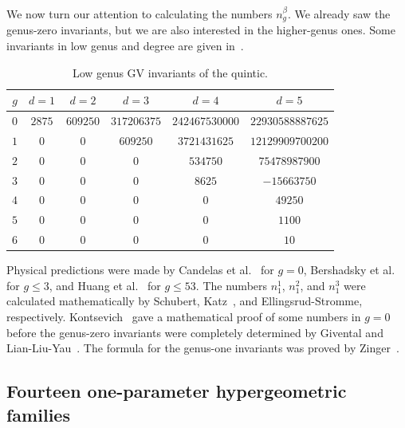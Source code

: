 \documentclass[10pt]{amsart}
\theoremstyle{definition}
\theoremstyle{remark}
\theoremstyle{plain}
\theoremstyle{definition}
\theoremstyle{remark}
\newcommand{\1}{\mathbf{1}}
\newcommand{\2}{\mathbf{2}}
\newcommand{\3}{\mathbf{3}}
\begin{document}
We now turn our attention to calculating the numbers $n_g^{\beta}$. We already saw the genus-zero invariants, but we are also interested in the higher-genus ones. Some invariants in low genus and degree are given in~.
\begin{table}[htpb]
    \centering
    \caption{Low genus GV invariants of the quintic.}
    \label{tab:g0gvquintic}
    \begin{tabular}{cccccc}
        \toprule
        $g$ & $d=1$ & $d=2$ & $d=3$ & $d=4$ & $d=5$ \\
        \midrule
        $0$ & $2875$ & $609250$ & $317206375$ & $242467530000$ & $22930588887625$ \\
        $1$ & $0$ & $0$ & $609250$ & $3721431625$ & $12129909700200$ \\
        $2$ & $0$ & $0$ & $0$ & $534750$ & $75478987900$ \\
        $3$ & $0$ & $0$ & $0$ & $8625$ & $-15663750$ \\
        $4$ & $0$ & $0$ & $0$ & $0$ & $49250$ \\
        $5$ & $0$ & $0$ & $0$ & $0$ & $1100$ \\
        $6$ & $0$ & $0$ & $0$ & $0$ & $10$ \\
        \bottomrule
    \end{tabular}
\end{table}

Physical predictions were made by Candelas et al.~\cite{cdgp} for $g=0$, Bershadsky et al.~\cite{bcov} for $g \leq 3$, and Huang et al.~\cite{hkq} for $g \leq 53$.
The numbers $n_1^1$, $n_1^2$, and $n_1^3$ were calculated mathematically by Schubert, Katz~\cite{katz}, and Ellingsrud-Stromme, respectively. Kontsevich~\cite{enumtorus} gave a mathematical proof of some numbers in $g=0$ before the genus-zero invariants were completely determined by Givental and Lian-Liu-Yau~\cite{eqgwinv,lly}. The formula for the genus-one invariants was proved by Zinger~\cite{reducedgenus1}.

\subsection{Fourteen one-parameter hypergeometric families}%
\label{sub:Fourteen one-parameter hypergeometric families}
\end{document}
